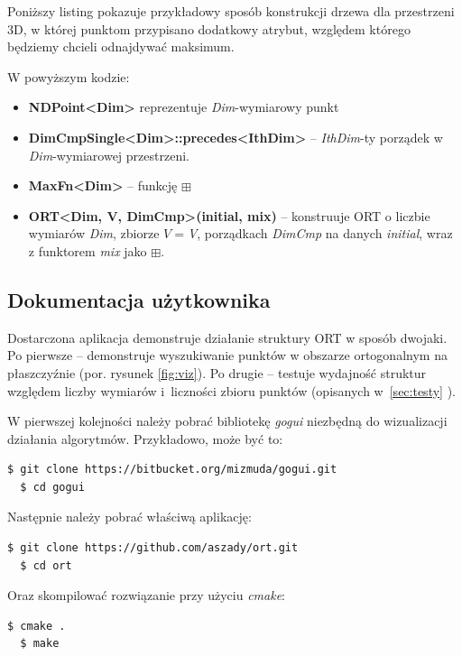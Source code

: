 \documentclass[a4paper]{article}
\begin{document}
Poniższy listing pokazuje przykładowy sposób konstrukcji drzewa dla przestrzeni 3D, w której punktom przypisano dodatkowy atrybut, względem którego będziemy chcieli odnajdywać maksimum.



W powyższym kodzie:
\begin{itemize}[noitemsep]
\item \textbf{NDPoint\textless Dim\textgreater } reprezentuje \emph{Dim}-wymiarowy punkt
\item \textbf{DimCmpSingle\textless Dim\textgreater ::precedes\textless IthDim\textgreater} -- \emph{IthDim}-ty porządek w \emph{Dim}-wymiarowej przestrzeni.
\item \textbf{MaxFn\textless Dim\textgreater} -- funkcję $\boxplus$
\item \textbf{ORT\textless Dim, V, DimCmp\textgreater(initial, mix)} -- konstruuje ORT o liczbie wymiarów \emph{Dim}, zbiorze $V=$\emph{V}, porządkach \emph{DimCmp} na danych \emph{initial}, wraz z funktorem \emph{mix} jako $\boxplus$.
\end{itemize}
\subsection{Dokumentacja użytkownika}

Dostarczona aplikacja demonstruje działanie struktury ORT w sposób dwojaki. Po pierwsze -- demonstruje wyszukiwanie punktów w obszarze ortogonalnym na płaszczyźnie (por. rysunek \ref{fig:viz}). Po drugie -- testuje wydajność struktur względem liczby wymiarów i~liczności zbioru punktów (opisanych w~\ref{sec:testy} ).

W pierwszej kolejności należy pobrać bibliotekę \emph{gogui} niezbędną do wizualizacji działania algorytmów. Przykładowo, może być to:
\begin{lstlisting}[language=bash]
  $ git clone https://bitbucket.org/mizmuda/gogui.git
  $ cd gogui
\end{lstlisting}

Następnie należy pobrać właściwą aplikację:
\begin{lstlisting}[language=bash]
  $ git clone https://github.com/aszady/ort.git
  $ cd ort
\end{lstlisting}

Oraz skompilować rozwiązanie przy użyciu \emph{cmake}:
\begin{lstlisting}[language=bash]
  $ cmake .
  $ make
\end{lstlisting}
\end{document}
